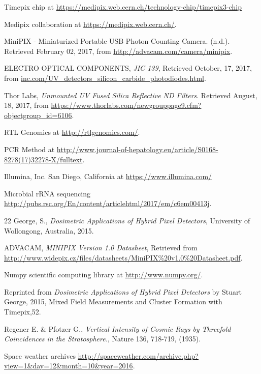 \begin{thebibliography}{9}
  Timepix chip at \url{https://medipix.web.cern.ch/technology-chip/timepix3-chip}

  Medipix collaboration at \url{https://medipix.web.cern.ch/}.

  MiniPIX - Miniaturized Portable USB Photon Counting Camera. (n.d.). Retrieved February 02, 2017, from \url{http://advacam.com/camera/minipix}.

  ELECTRO OPTICAL COMPONENTS, \textit{JIC 139}, Retrieved October, 17, 2017, from \url{inc.com/UV_detectors_silicon_carbide_photodiodes.html}.

  Thor Labs, \textit{Unmounted UV Fused Silica Reflective ND Filters}. Retrieved August, 18, 2017, from \url{https://www.thorlabs.com/newgrouppage9.cfm?objectgroup_id=6106}.

  RTL Genomics at \url{http://rtlgenomics.com/}.

PCR Method at \url{http://www.journal-of-hepatology.eu/article/S0168-8278(17)32278-X/fulltext}.
	
	Illumina, Inc. San Diego, California at \url{https://www.illumina.com/}

Microbial rRNA sequencing \url{http://pubs.rsc.org/En/content/articlehtml/2017/em/c6em00413j}.
  
 22
  George, S., \textit{Dosimetric Applications of Hybrid Pixel Detectors}, University of Wollongong, Australia, 2015.

  ADVACAM, \textit{MINIPIX Version 1.0 Datasheet}, Retrieved from \url{http://www.widepix.cz/files/datasheets/MiniPIX\%20v1.0\%20Datasheet.pdf}.

  Numpy scientific computing library at \url{http://www.numpy.org/}.

	Reprinted from \textit{Dosimetric Applications of Hybrid Pixel Detectors} by Stuart George, 2015, Mixed Field Measurements and Cluster Formation with Timepix,52.

 Regener E. \& Pfotzer G., \textit{Vertical Intensity of Cosmic Rays by Threefold Coincidences in the Stratosphere.}, Nature 136, 718-719, (1935). 

Space weather archives \url{http://spaceweather.com/archive.php?view=1&day=12&month=10&year=2016}.


\end{thebibliography}
